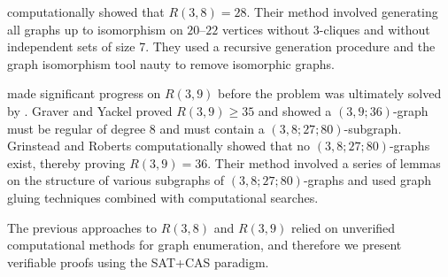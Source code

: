  computationally showed that $R(3, 8) = 28$. Their method involved generating all graphs up to isomorphism on $20$--$22$ vertices without 3-cliques and without independent sets of size 7. They used a recursive generation procedure and the graph isomorphism tool nauty to remove isomorphic graphs.

 made significant progress on $R(3, 9)$ before the problem was ultimately solved by . Graver and Yackel proved $R(3, 9) \geq 35$ and showed a $(3, 9; 36)$-graph must be regular of degree 8 and must contain a $(3, 8; 27; 80)$-subgraph. Grinstead and Roberts computationally showed that no $(3, 8; 27; 80)$-graphs exist, thereby proving $R(3, 9) = 36$. Their method involved a series of lemmas on the structure of various subgraphs of $(3, 8; 27; 80)$-graphs and used graph gluing techniques combined with computational searches.

The previous approaches to $R(3, 8)$ and $R(3, 9)$ relied on unverified computational methods for graph enumeration,
and therefore we present verifiable proofs using the SAT+CAS paradigm.